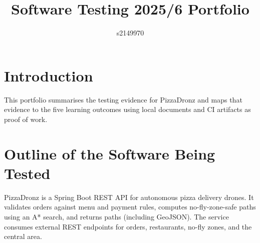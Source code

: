 \documentclass{article}
\title{Software Testing 2025/6 Portfolio}
\author{s2149970}
\begin{document}
\maketitle

\section{Introduction}
This portfolio summarises the testing evidence for PizzaDronz and maps that evidence to the five learning outcomes using local documents and CI artifacts as proof of work.

\section{Outline of the Software Being Tested}
PizzaDronz is a Spring Boot REST API for autonomous pizza delivery drones. It validates orders against menu and payment rules, computes no-fly-zone-safe paths using an A* search, and returns paths (including GeoJSON). The service consumes external REST endpoints for orders, restaurants, no-fly zones, and the central area.
\end{document}
